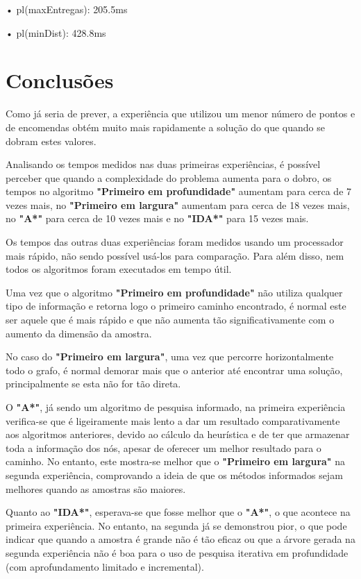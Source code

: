 \documentclass[a4paper]{article}
\begin{document}
	• pl(maxEntregas): 205.5ms

	• pl(minDist): 428.8ms

\newpage

\section{Conclusões}

Como já seria de prever, a experiência que utilizou um menor número de pontos e de encomendas obtém muito mais rapidamente a solução do que quando se dobram estes valores. 

Analisando os tempos medidos nas duas primeiras experiências, é possível perceber que quando a complexidade do problema aumenta para o dobro, os tempos no algoritmo \textbf{"Primeiro em profundidade"} aumentam para cerca de 7 vezes mais, no \textbf{"Primeiro em largura"} aumentam para cerca de 18 vezes mais, no \textbf{"A*"} para cerca de 10 vezes mais e no \textbf{"IDA*"} para 15 vezes mais.

Os tempos das outras duas experiências foram medidos usando um processador mais rápido, não sendo possível usá-los para comparação. Para além disso, nem todos os algoritmos foram executados em tempo útil.

Uma vez que o algoritmo \textbf{"Primeiro em profundidade"} não utiliza qualquer tipo de informação e retorna logo o primeiro caminho encontrado, é normal este ser aquele que é mais rápido e que não aumenta tão significativamente com o aumento da dimensão da amostra.

No caso do \textbf{"Primeiro em largura"}, uma vez que percorre horizontalmente todo o grafo, é normal demorar mais que o anterior até encontrar uma solução, principalmente se esta não for tão direta.

O \textbf{"A*"}, já sendo um algoritmo de pesquisa informado, na primeira experiência verifica-se que é ligeiramente mais lento a dar um resultado comparativamente aos algoritmos anteriores, devido ao cálculo da heurística e de ter que armazenar toda a informação dos nós, apesar de oferecer um melhor resultado para o caminho. No entanto, este mostra-se melhor que o \textbf{"Primeiro em largura"} na segunda experiência, comprovando a ideia de que os métodos informados sejam melhores quando as amostras são maiores.

Quanto ao \textbf{"IDA*"}, esperava-se que fosse melhor que o \textbf{"A*"}, o que acontece na primeira experiência. No entanto, na segunda já se demonstrou pior, o que pode indicar que quando a amostra é grande não é tão eficaz ou que a árvore gerada na segunda experiência não é boa para o uso de pesquisa iterativa em profundidade (com aprofundamento limitado e incremental).
\end{document}
